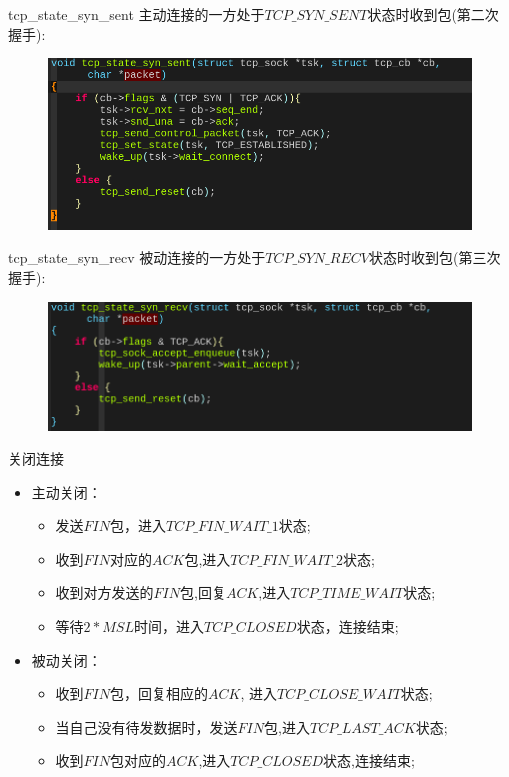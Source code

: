 \documentclass{beamer}
\begin{document}
\begin{frame}{tcp\_state\_syn\_sent}
  主动连接的一方处于$TCP\_SYN\_SENT$状态时收到包(第二次握手):
  \begin{figure}[H]
	\centering
	\includegraphics[scale = 0.35]{./fig/syn_sent.png}
  \end{figure}
\end{frame}

\begin{frame}{tcp\_state\_syn\_recv}
  被动连接的一方处于$TCP\_SYN\_RECV$状态时收到包(第三次握手):
  \begin{figure}[H]
	\centering
	\includegraphics[scale = 0.35]{./fig/syn_recv.png}
  \end{figure}
\end{frame}

\begin{frame}{关闭连接}
  \begin{itemize}
	\item 主动关闭：
	  \begin{itemize}
		\item 发送$FIN$包，进入$TCP\_FIN\_WAIT\_1$状态;
		\item 收到$FIN$对应的$ACK$包,进入$TCP\_FIN\_WAIT\_2$状态;
		\item 收到对方发送的$FIN$包,回复$ACK$,进入$TCP\_TIME\_WAIT$状态;
		\item 等待$2*MSL$时间，进入$TCP\_CLOSED$状态，连接结束;
	  \end{itemize}
	  \item 被动关闭：
		\begin{itemize}
		  \item 收到$FIN$包，回复相应的$ACK$, 进入$TCP\_CLOSE\_WAIT$状态;
		  \item 当自己没有待发数据时，发送$FIN$包,进入$TCP\_LAST\_ACK$状态;
		  \item 收到$FIN$包对应的$ACK$,进入$TCP\_CLOSED$状态,连接结束;
		\end{itemize}
  \end{itemize}
\end{frame}
\end{document}

